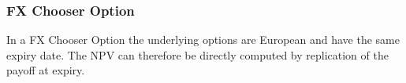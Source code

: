 \subsubsection{FX Chooser Option}
\label{pricing:fx_chooseroption}

In a FX Chooser Option the underlying options are European and have the same expiry
date. The NPV can therefore be directly computed by replication of the payoff at expiry.


